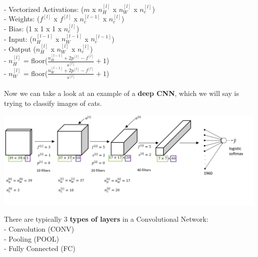 \documentclass[11pt, a4paper]{article}
\begin{document}
\begin{spacing}{1.1}
	\hspace*{7mm} - Vectorized Activations: ($m$ x $n^{[l]}_H$ x $n^{[l]}_W$ x $n_c^{[l]}$) \vspace*{1mm}\\
	\hspace*{3mm} - Weights: ($f^{[l]}$ x $f^{[l]}$ x $n_c^{[l-1]}$ x $n_c^{[l]}$) \\
	\hspace*{3mm} - Bias: (1 x 1 x 1 x $n_c^{[l]}$) \vspace*{1mm}\\
	\hspace*{3mm} - Input: ($n^{[l-1]}_H$ x $n^{[l-1]}_W$ x $n_c^{[l-1]}$) \vspace*{1mm} \\
	\hspace*{3mm} - Output ($n^{[l]}_H$ x $n^{[l]}_W$ x $n_c^{[l]}$) \vspace*{1mm} \\ 
	\hspace*{3mm} - $n^{[l]}_H$ = floor($\frac{n^{[l-1]}_H + 2p^{[l]} - f^{[l]}}{s^{[l]}}+1$)\vspace*{1mm} \\
	\hspace*{3mm} - $n^{[l]}_W$ = floor($\frac{n^{[l-1]}_W + 2p^{[l]} - f^{[l]}}{s^{[l]}}+1$) \\~\\
	Now we can take a look at an example of a \textbf{deep CNN}, which we will say is trying to classify images of cats. 
	\begin{center}	\includegraphics[scale=.36]{cnn_ex}	\end{center} \newpage

	\noindent There are typically 3 \textbf{types of layers} in a Convolutional Network: \\
	- Convolution (CONV) \\
	- Pooling (POOL) \\
	- Fully Connected (FC) 

\end{spacing}
\end{document}
